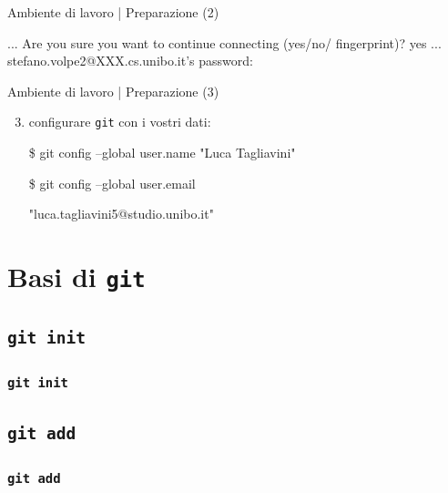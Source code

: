 \documentclass{beamer}
\begin{document}
\begin{frame}{Ambiente di lavoro | Preparazione (2)}
  \begin{semiverbatim}
  \lbrack ...\rbrack \newline
  Are you sure you want to continue connecting \newline (yes/no/\lbrack
  fingerprint\rbrack)? yes \newline
  \lbrack ...\rbrack \newline
  stefano.volpe2@XXX.cs.unibo.it's password:
  \end{semiverbatim}
\end{frame}

\begin{frame}{Ambiente di lavoro | Preparazione (3)}
  \begin{enumerate}
    \setcounter{enumi}{2}
    \item configurare \texttt{git} con i vostri dati:
    \begin{semiverbatim}
    \$ git config --global user.name "Luca Tagliavini"
    \end{semiverbatim}
    \begin{semiverbatim}
    \$ git config --global user.email \\
    \end{semiverbatim}
    \begin{semiverbatim}
        \qquad"luca.tagliavini5@studio.unibo.it"
    \end{semiverbatim}
  \end{enumerate}
\end{frame}

\section{Basi di \texttt{git}}

\subsection{\texttt{git init}}
\begin{frame}
  \frametitle{\texttt{git init}}
\end{frame}

\subsection{\texttt{git add}}
\begin{frame}
  \frametitle{\texttt{git add}}
\end{frame}
\end{document}
